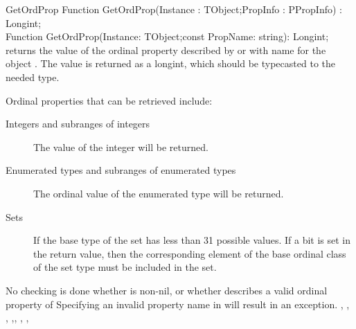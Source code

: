 \begin{function}{GetOrdProp}
\Declaration
Function GetOrdProp(Instance : TObject;PropInfo : PPropInfo) : Longint;\\
Function GetOrdProp(Instance: TObject;const PropName: string): Longint;
\Description
{} returns the value of the ordinal property described by
 or with name  for the object . 
The value is returned as a longint, which should be typecasted to the 
needed type.

Ordinal properties that can be retrieved include:
\begin{description}
\item[Integers and subranges of integers] The value of the integer will be
returned.
\item[Enumerated types and subranges of enumerated types] The ordinal value
of the enumerated type will be returned.
\item[Sets] If the base type of the set has less than 31 possible values.
If a bit is set in the return value, then the corresponding element of the
base ordinal class of the set type must be included in the set.
\end{description}
\Errors
No checking is done whether  is non-nil, or whether
 describes a valid ordinal property of 
Specifying an invalid property name in  will result in an
 exception.
\SeeAlso
{}, , ,
,, ,
, 
\end{function}



